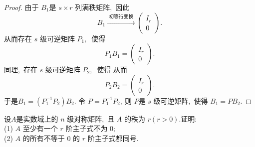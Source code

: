 \begin{proof}
	由于 $ B_{1}  $是 $ s \times r$  列满秩矩阵,\  因此
	$$B_{1} \xrightarrow{\text { 初等行变换 }}\left(\begin{array}{l}
		I_{r} \\
		0
	\end{array}\right).$$
	从而存在 $ s$  级可逆矩阵  $P_{1} ,\ $ 使得
	$$P_{1} B_{1}=\left(\begin{array}{l}
		I_{r} \\
		0
	\end{array}\right) .$$
	同理,\  存在 $ s $ 级可逆矩阵 $ P_{2} ,\ $ 使得
	从而
	$$P_{2} B_{2}=\left(\begin{array}{l}
		I_{r} \\
		0
	\end{array}\right) .$$
	于是$  B_{1}=\left(P_{1}^{-1} P_{2}\right) B_{2} .$
	令  $P=P_{1}^{-1} P_{2} ,\  $则 $ P  $是  $s$  级可逆矩阵,\  使得 $ B_{1}=P B_{2} .$
\end{proof}
\newpage
\begin{problem}
	设$  A  $是实数域上的  $n$  级对称矩阵,\  且 $ A $ 的秩为  $r(r>0) .$证明:\\
	(1) $ A$  至少有一个  $r $ 阶主子式不为 $0 ;$\\
	(2) $ A$  的所有不等于 $0$ 的 $ r$  阶主子式都同号.
\end{problem}
